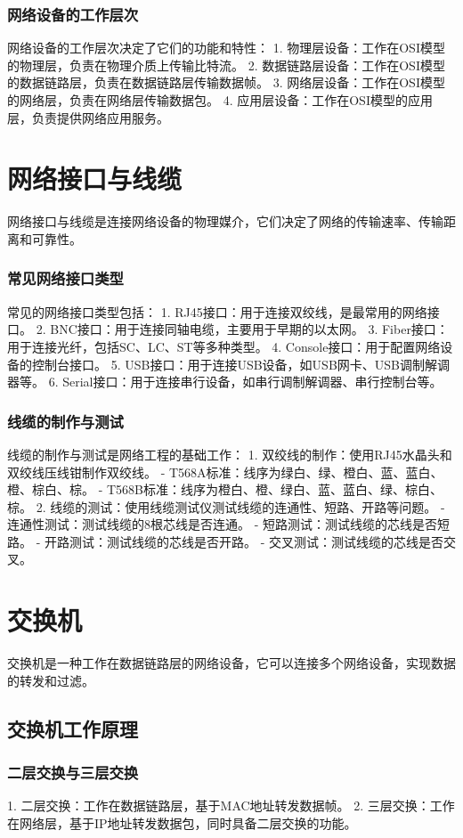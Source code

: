\documentclass{book}
\begin{document}
\subsubsection{网络设备的工作层次}
网络设备的工作层次决定了它们的功能和特性：
1. 物理层设备：工作在OSI模型的物理层，负责在物理介质上传输比特流。
2. 数据链路层设备：工作在OSI模型的数据链路层，负责在数据链路层传输数据帧。
3. 网络层设备：工作在OSI模型的网络层，负责在网络层传输数据包。
4. 应用层设备：工作在OSI模型的应用层，负责提供网络应用服务。
\section{网络接口与线缆}
网络接口与线缆是连接网络设备的物理媒介，它们决定了网络的传输速率、传输距离和可靠性。
\subsubsection{常见网络接口类型}
常见的网络接口类型包括：
1. RJ45接口：用于连接双绞线，是最常用的网络接口。
2. BNC接口：用于连接同轴电缆，主要用于早期的以太网。
3. Fiber接口：用于连接光纤，包括SC、LC、ST等多种类型。
4. Console接口：用于配置网络设备的控制台接口。
5. USB接口：用于连接USB设备，如USB网卡、USB调制解调器等。
6. Serial接口：用于连接串行设备，如串行调制解调器、串行控制台等。
\subsubsection{线缆的制作与测试}
线缆的制作与测试是网络工程的基础工作：
1. 双绞线的制作：使用RJ45水晶头和双绞线压线钳制作双绞线。
   - T568A标准：线序为绿白、绿、橙白、蓝、蓝白、橙、棕白、棕。
   - T568B标准：线序为橙白、橙、绿白、蓝、蓝白、绿、棕白、棕。
2. 线缆的测试：使用线缆测试仪测试线缆的连通性、短路、开路等问题。
   - 连通性测试：测试线缆的8根芯线是否连通。
   - 短路测试：测试线缆的芯线是否短路。
   - 开路测试：测试线缆的芯线是否开路。
   - 交叉测试：测试线缆的芯线是否交叉。
\section{交换机}
交换机是一种工作在数据链路层的网络设备，它可以连接多个网络设备，实现数据的转发和过滤。
\subsection{交换机工作原理}
\subsubsection{二层交换与三层交换}
1. 二层交换：工作在数据链路层，基于MAC地址转发数据帧。
2. 三层交换：工作在网络层，基于IP地址转发数据包，同时具备二层交换的功能。
\end{document}
